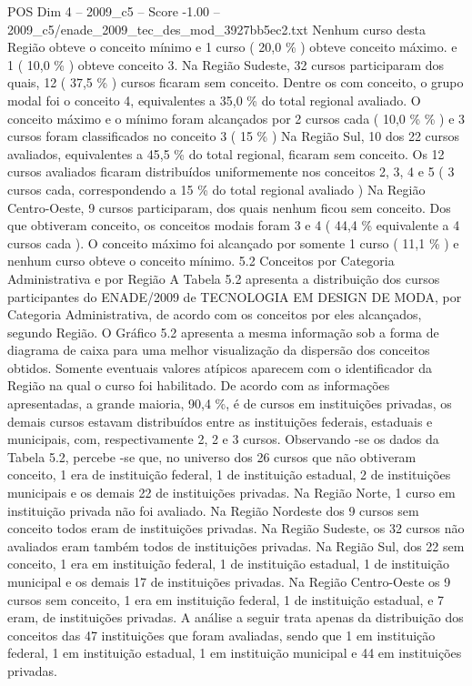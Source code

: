 \begin{textsample}{POS Dim 4 – 2009\_c5 – Score -1.00 – 2009\_c5/enade\_2009\_tec\_des\_mod\_3927bb5ec2.txt}
Nenhum curso desta Região obteve o conceito mínimo e 1 curso ( 20,0 \% ) obteve conceito máximo. e 1 ( 10,0 \% ) obteve conceito 3.
Na Região Sudeste, 32 cursos participaram dos quais, 12 ( 37,5 \% ) cursos ficaram sem conceito.
Dentre os com conceito, o grupo modal foi o conceito 4, equivalentes a 35,0 \% do total regional avaliado.
O conceito máximo e o mínimo foram alcançados por 2 cursos cada ( 10,0 \% \% ) e 3 cursos foram classificados no conceito 3 ( 15 \% ) Na Região Sul, 10 dos 22 cursos avaliados, equivalentes a 45,5 \% do total regional, ficaram sem conceito.
Os 12 cursos avaliados ficaram distribuídos uniformemente nos conceitos 2, 3, 4 e 5 ( 3 cursos cada, correspondendo a 15 \% do total regional avaliado ) Na Região Centro-Oeste, 9 cursos participaram, dos quais nenhum ficou sem conceito.
Dos que obtiveram conceito, os conceitos modais foram 3 e 4 ( 44,4 \% equivalente a 4 cursos cada ).
O conceito máximo foi alcançado por somente 1 curso ( 11,1 \% ) e nenhum curso obteve o conceito mínimo. 5.2 Conceitos por Categoria Administrativa e por Região A Tabela 5.2 apresenta a distribuição dos cursos participantes do ENADE/2009 de TECNOLOGIA EM DESIGN DE MODA, por Categoria Administrativa, de acordo com os conceitos por eles alcançados, segundo Região.
O Gráfico 5.2 apresenta a mesma informação sob a forma de diagrama de caixa para uma melhor visualização da dispersão dos conceitos obtidos.
Somente eventuais valores atípicos aparecem com o identificador da Região na qual o curso foi habilitado.
De acordo com as informações apresentadas, a grande maioria, 90,4 \%, é de cursos em instituições privadas, os demais cursos estavam distribuídos entre as instituições federais, estaduais e municipais, com, respectivamente 2, 2 e 3 cursos.
Observando -se os dados da Tabela 5.2, percebe -se que, no universo dos 26 cursos que não obtiveram conceito, 1 era de instituição federal, 1 de instituição estadual, 2 de instituições municipais e os demais 22 de instituições privadas.
Na Região Norte, 1 curso em instituição privada não foi avaliado.
Na Região Nordeste dos 9 cursos sem conceito todos eram de instituições privadas.
Na Região Sudeste, os 32 cursos não avaliados eram também todos de instituições privadas.
Na Região Sul, dos 22 sem conceito, 1 era em instituição federal, 1 de instituição estadual, 1 de instituição municipal e os demais 17 de instituições privadas.
Na Região Centro-Oeste os 9 cursos sem conceito, 1 era em instituição federal, 1 de instituição estadual, e 7 eram, de instituições privadas.
A análise a seguir trata apenas da distribuição dos conceitos das 47 instituições que foram avaliadas, sendo que 1 em instituição federal, 1 em instituição estadual, 1 em instituição municipal e 44 em instituições privadas.

\end{textsample}
